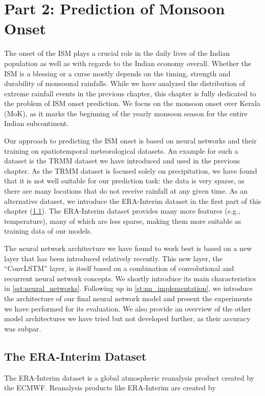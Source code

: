 \chapter{Part 2: Prediction of Monsoon Onset}
\label{c:part2}
The onset of the ISM plays a crucial role in the daily lives of the Indian population as well as with regards to the Indian economy overall. Whether the ISM is a blessing or a curse mostly depends on the timing, strength and durability of monsoonal rainfalls. While we have analyzed the distribution of extreme rainfall events in the previous chapter, this chapter is fully dedicated to the problem of ISM onset prediction. We focus on the monsoon onset over Kerala (MoK), as it marks the beginning of the yearly monsoon season for the entire Indian subcontinent.

Our approach to predicting the ISM onset is based on neural networks and their training on spatiotemporal meteorological datasets. An example for such a dataset is the TRMM dataset we have introduced and used in the previous chapter. As the TRMM dataset is focused solely on precipitation, we have found that it is not well suitable for our prediction task: the data is very sparse, as there are many locations that do not receive rainfall at any given time. As an alternative dataset, we introduce the ERA-Interim dataset in the first part of this chapter (\cref{st:era_interim}). The ERA-Interim dataset provides many more features (e.g., temperature), many of which are less sparse, making them more suitable as training data of our models.

The neural network architecture we have found to work best is based on a new layer that has been introduced relatively recently. This new layer, the ``ConvLSTM'' layer, is itself based on a combination of convolutional and recurrent neural network concepts. We shortly introduce its main characteristics in \cref{sst:neural_networks}. Following up in \cref{st:nn_implementation}, we introduce the architecture of our final neural network model and present the experiments we have performed for its evaluation. We also provide an overview of the other model architectures we have tried but not developed further, as their accuracy was subpar.

\section{The ERA-Interim Dataset}
\label{st:era_interim}
The ERA-Interim dataset is a global atmospheric reanalysis product created by the ECMWF. Reanalysis products like ERA-Interim are created by

